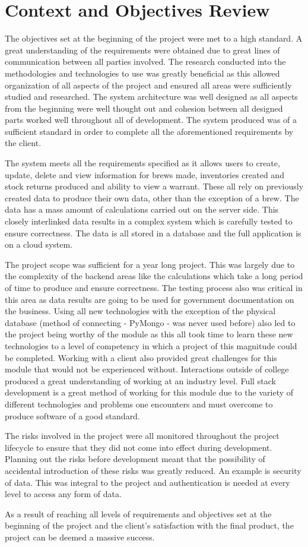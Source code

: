 \section{Context and Objectives Review}
The objectives set at the beginning of the project were met to a high standard. A great understanding of the requirements were obtained due to great lines of communication between all parties involved. The research conducted into the methodologies and technologies to use was greatly beneficial as this allowed organization of all aspects of the project and ensured all areas were sufficiently studied and researched. The system architecture was well designed as all aspects from the beginning were well thought out and cohesion between all designed parts worked well throughout all of development. The system produced was of a sufficient standard in order to complete all the aforementioned requirements by the client.\par
The system meets all the requirements specified as it allows users to create, update, delete and view information for brews made, inventories created and stock returns produced and ability to view a warrant. These all rely on previously created data to produce their own data, other than the exception of a brew. The data has a mass amount of calculations carried out on the server side. This closely interlinked data results in a complex system which is carefully tested to ensure correctness. The data is all stored in a database and the full application is on a cloud system.\par
The project scope was sufficient for a year long project. This was largely due to the complexity of the backend areas like the calculations which take a long period of time to produce and ensure correctness. The testing process also was critical in this area as data results are going to be used for government documentation on the business. Using all new technologies with the exception of the physical database (method of connecting - PyMongo - was never used before) also led to the project being worthy of the module as this all took time to learn these new technologies to a level of competency in which a project of this magnitude could be completed. Working with a client also provided great challenges for this module that would not be experienced without. Interactions outside of college produced a great understanding of working at an industry level. Full stack development is a great method of working for this module due to the variety of different technologies and problems one encounters and must overcome to produce software of a good standard.\par
The risks involved in the project were all monitored throughout the project lifecycle to ensure that they did not come into effect during development. Planning out the risks before development meant that the possibility of accidental introduction of these risks was greatly reduced. An example is security of data. This was integral to the project and authentication is needed at every level to access any form of data.\par
As a result of reaching all levels of requirements and objectives set at the beginning of the project and the client's satisfaction with the final product, the project can be deemed a massive success.

